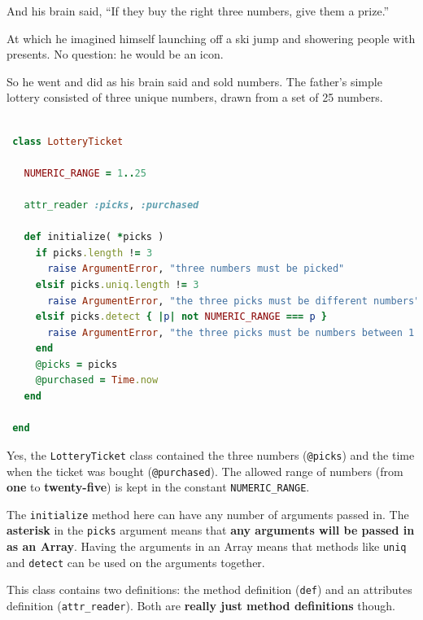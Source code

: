 \documentclass[10pt,twoside]{report}
\begin{document}
And his brain said, ``If they buy the right three numbers, give them a
prize.''

At which he imagined himself launching off a ski jump and showering
people with presents.  No question: he would be an icon.

So he went and did as his brain said and sold numbers.  The father's
simple lottery consisted of three unique numbers, drawn from a set of
25 numbers.


\begin{lstlisting}[basicstyle=\ttfamily\color{basiccolor},
    commentstyle = \ttfamily\color{commentcolor},
    keywordstyle=\ttfamily\color{keywordscolor},
    stringstyle=\color{stringcolor},
    language=Ruby,
    basicstyle=\small\ttfamily,
    showstringspaces=false,
  ]

 class LotteryTicket

   NUMERIC_RANGE = 1..25

   attr_reader :picks, :purchased

   def initialize( *picks )
     if picks.length != 3
       raise ArgumentError, "three numbers must be picked"
     elsif picks.uniq.length != 3
       raise ArgumentError, "the three picks must be different numbers"
     elsif picks.detect { |p| not NUMERIC_RANGE === p }
       raise ArgumentError, "the three picks must be numbers between 1 and 25."
     end
     @picks = picks
     @purchased = Time.now
   end

 end

\end{lstlisting}


Yes, the \lstinline[breaklines=true]|LotteryTicket| class contained
the three numbers (\lstinline[breaklines=true]|@picks|) and the time
when the ticket was bought (\lstinline[breaklines=true]|@purchased|).
The allowed range of numbers (from {\bf one} to {\bf twenty-five}) is
kept in the constant \lstinline[breaklines=true]|NUMERIC_RANGE|.

The \lstinline[breaklines=true]|initialize| method here can have any
number of arguments passed in.  The {\bf asterisk} in the
\lstinline[breaklines=true]|picks| argument means that {\bf any
  arguments will be passed in as an Array}.  Having the arguments in
an Array means that methods like \lstinline[breaklines=true]|uniq| and
\lstinline[breaklines=true]|detect| can be used on the arguments
together.

This class contains two definitions: the method definition
(\lstinline[breaklines=true]|def|) and an attributes definition
(\lstinline[breaklines=true]|attr_reader|).  Both are {\bf really just
  method definitions} though.
\end{document}
